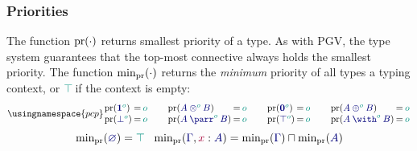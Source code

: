 \subsubsection*{Priorities}
\label{sec:pcp-priorities}
The function $\operatorname{pr}(\cdot)$ returns smallest priority of a type. As with PGV, the type system guarantees that the top-most connective always holds the smallest priority.  The function $\text{min}_{\operatorname{pr}}(\cdot)$ returns the \emph{minimum} priority of all types a typing context, or $\cs{\ptop}$ if the context is empty:
\[
  \usingnamespace{pcp}
  \setlength{\arraycolsep}{1pt}
  \begin{array}{lclclcl}
    \pr(\ty{\tyone[\cs{o}]})        & = & \cs{o} \\
    \pr(\ty{\tybot[\cs{o}]})        & = & \cs{o}
  \end{array}
  \qquad
  \begin{array}{lclclcl}
    \pr(\ty{\tytens[\cs{o}]{A}{B}}) & = & \cs{o} \\
    \pr(\ty{\typarr[\cs{o}]{A}{B}}) & = & \cs{o}
  \end{array}
  \qquad
  \begin{array}{lclclcl}
    \pr(\ty{\tynil[\cs{o}]})        & = & \cs{o} \\
    \pr(\ty{\tytop[\cs{o}]})        & = & \cs{o}
  \end{array}
  \qquad
  \begin{array}{lclclcl}
    \pr(\ty{\typlus[\cs{o}]{A}{B}}) & = & \cs{o} \\
    \pr(\ty{\tywith[\cs{o}]{A}{B}}) & = & \cs{o} 
  \end{array}
\]
\[
  \minpr(\ty{\emptyenv})          = \cs{\ptop}
  \quad
  \minpr(\ty{\Gamma},\tmty{x}{A}) = \minpr(\ty{\Gamma})\sqcap\minpr(\ty{A})
\]

